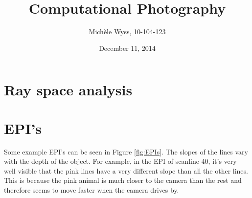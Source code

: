 \documentclass[a4paper]{article}
\title{Computational Photography}
\author{Mich\`ele Wyss, 10-104-123}
\date{December 11, 2014}
\begin{document}
\maketitle

\section*{Ray space analysis}
\section*{EPI's}
Some example EPI's can be seen in Figure \ref{fig:EPIs}. 
The slopes of the lines vary with the depth of the object. 
For example, in the EPI of scanline 40, it's very well visible that the pink lines have a very different slope than all the other lines. 
This is because the pink animal is much closer to the camera than the rest and therefore seems to move faster when the camera drives by.
\end{document}
